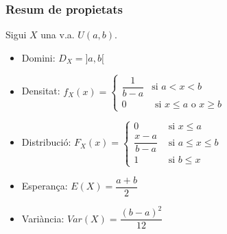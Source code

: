 \documentclass[12pt,t]{beamer}\usepackage[]{graphicx}\usepackage[]{color}
\renewcommand{\leq}{\leqslant}
\renewcommand{\geq}{\geqslant}
\theoremstyle{plain}
\theoremstyle{definition}
\begin{document}
\begin{frame}
\frametitle{Resum de propietats}
\vspace*{-2ex}

 Sigui $X$ una v.a. $U(a,b)$.
 \medskip
 
\begin{itemize}
\item  Domini: $D_X=]a,b[$
\medskip

\item Densitat: $f_X(x)=\left\{\begin{array}{ll}
\dfrac{1}{b-a} & \mbox{si } a<x<b\\ 0  & \mbox{ si $x\leq a$ o $x\geq b$}
\end{array} \right.$
\medskip

\item Distribució: $F_X(x)=\left\{\begin{array}{ll} 0 & \mbox{ si } x\leq a\\
          \dfrac{x-a}{b-a} & \mbox{ si } a\leq x\leq b\\
          1 & \mbox{ si } b\leq x\end{array}\right.$
 \medskip
         
\item Esperança: $E(X)= \dfrac{a+b}{2}$
\medskip

\item Variància: $Var(X)=\dfrac{(b-a)^2}{12}$
\end{itemize}

\end{frame}
\end{document}
